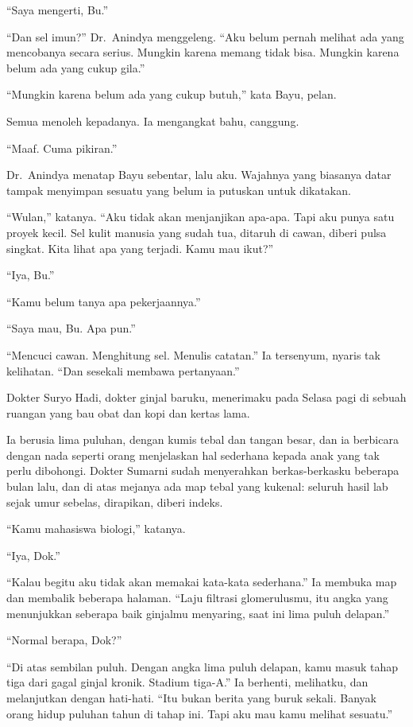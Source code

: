 \documentclass[11pt,twoside,openany]{book}
\makeatletter
\newcommand{\scenebreak}{\par\vspace{0.9em}{\centering\textsc{*\hspace{0.7em}*\hspace{0.7em}*}\par}\vspace{0.9em}\@afterindentfalse\@afterheading}
\makeatother
\begin{document}
``Saya mengerti, Bu.''

``Dan sel imun?'' Dr.~Anindya menggeleng. ``Aku belum pernah melihat ada yang mencobanya secara serius. Mungkin karena memang tidak bisa. Mungkin karena belum ada yang cukup gila.''

``Mungkin karena belum ada yang cukup butuh,'' kata Bayu, pelan.

Semua menoleh kepadanya. Ia mengangkat bahu, canggung.

``Maaf. Cuma pikiran.''

Dr.~Anindya menatap Bayu sebentar, lalu aku. Wajahnya yang biasanya datar tampak menyimpan sesuatu yang belum ia putuskan untuk dikatakan.

``Wulan,'' katanya. ``Aku tidak akan menjanjikan apa-apa. Tapi aku punya satu proyek kecil. Sel kulit manusia yang sudah tua, ditaruh di cawan, diberi pulsa singkat. Kita lihat apa yang terjadi. Kamu mau ikut?''

``Iya, Bu.''

``Kamu belum tanya apa pekerjaannya.''

``Saya mau, Bu. Apa pun.''

``Mencuci cawan. Menghitung sel. Menulis catatan.'' Ia tersenyum, nyaris tak kelihatan. ``Dan sesekali membawa pertanyaan.''

\scenebreak
Dokter Suryo Hadi, dokter ginjal baruku, menerimaku pada Selasa pagi di sebuah ruangan yang bau obat dan kopi dan kertas lama.

Ia berusia lima puluhan, dengan kumis tebal dan tangan besar, dan ia berbicara dengan nada seperti orang menjelaskan hal sederhana kepada anak yang tak perlu dibohongi. Dokter Sumarni sudah menyerahkan berkas-berkasku beberapa bulan lalu, dan di atas mejanya ada map tebal yang kukenal: seluruh hasil lab sejak umur sebelas, dirapikan, diberi indeks.

``Kamu mahasiswa biologi,'' katanya.

``Iya, Dok.''

``Kalau begitu aku tidak akan memakai kata-kata sederhana.'' Ia membuka map dan membalik beberapa halaman. ``Laju filtrasi glomerulusmu, itu angka yang menunjukkan seberapa baik ginjalmu menyaring, saat ini lima puluh delapan.''

``Normal berapa, Dok?''

``Di atas sembilan puluh. Dengan angka lima puluh delapan, kamu masuk tahap tiga dari gagal ginjal kronik. Stadium tiga-A.'' Ia berhenti, melihatku, dan melanjutkan dengan hati-hati. ``Itu bukan berita yang buruk sekali. Banyak orang hidup puluhan tahun di tahap ini. Tapi aku mau kamu melihat sesuatu.''
\end{document}
